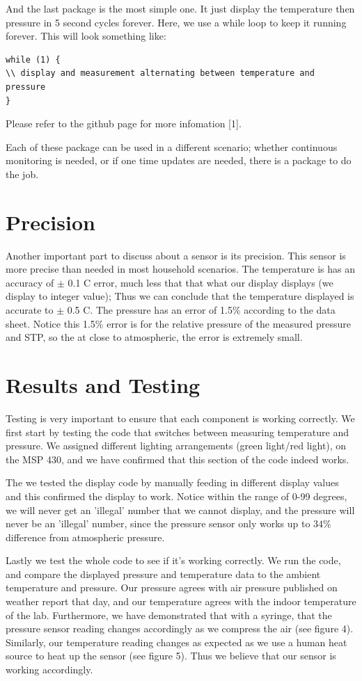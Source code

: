 \documentclass{article}
\begin{document}
And the last package is the most simple one. It just display the temperature then pressure in 5 second cycles forever. Here, we use a while loop to keep it running forever. This will look something like: 
\begin{lstlisting}[style=CStyle]
while (1) {
\\ display and measurement alternating between temperature and pressure
}
\end{lstlisting}
Please refer to the github page for more infomation [1].  

Each of these package can be used in a different scenario; whether continuous monitoring is needed, or if one time updates are needed, there is a package to do the job. 

\section{Precision} 
Another important part to discuss about a sensor is its precision. This sensor is more precise than needed in most household scenarios. The temperature is has an accuracy of $\pm$ 0.1 \textdegree C error, much less that that what our display displays (we display to integer value); Thus we can conclude that the temperature displayed is accurate to $\pm$ 0.5  \textdegree C. The pressure has an error of 1.5$\%$ according to the data sheet. Notice this 1.5$\%$ error is for the relative pressure of the measured pressure and STP, so the at close to atmospheric, the error is extremely small. 

\section{Results and Testing}
Testing is very important to ensure that each component is working correctly. We first start by testing the code that switches between measuring temperature and pressure. We assigned different lighting arrangements (green light/red light), on the MSP 430, and we have confirmed that this section of the code indeed works.

The we tested the display code by manually feeding in different display values and this confirmed the display to work. Notice within the range of 0-99 degrees, we will never get an 'illegal' number that we cannot display, and the pressure will never be an 'illegal' number, since the pressure sensor only works up to $34\%$ difference from atmospheric pressure. 

Lastly we test the whole code to see if it's working correctly. We run the code, and compare the displayed pressure and temperature data to the ambient temperature and pressure. Our pressure agrees with air pressure published on weather report that day, and our temperature agrees with the indoor temperature of the lab. Furthermore, we have demonstrated that with a syringe, that the pressure sensor reading changes accordingly as we compress the air (see figure 4). Similarly, our temperature reading changes as expected as we use a human heat source to heat up the sensor (see figure 5). Thus we believe that our sensor is working accordingly. 
\end{document}
